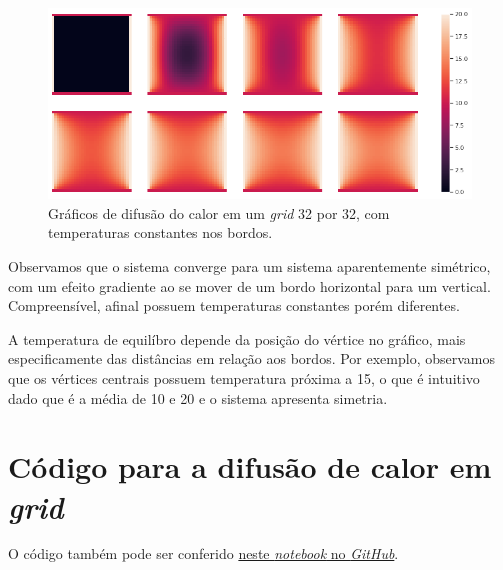 \documentclass{article}
\begin{document}
\begin{itemize}
                \begin{figure}[!h]
                    \includegraphics[width=\textwidth]{graph_2.png}
                    \caption{Gráficos de difusão do calor em um \textit{grid} 32 por 32, com temperaturas constantes nos bordos.}
                    \label{fig:graph_2}
                \end{figure}

                Observamos que o sistema converge para um sistema aparentemente simétrico, com um efeito gradiente ao se mover
                de um bordo horizontal para um vertical. Compreensível, afinal possuem temperaturas constantes porém diferentes.

                A temperatura de equilíbro depende da posição do vértice no gráfico, mais especificamente das distâncias em relação aos bordos.
                Por exemplo, observamos que os vértices centrais possuem temperatura próxima a 15, o que é intuitivo dado que é a média de 10 e 20
                e o sistema apresenta simetria.

        \end{itemize}

    \appendix

    \section{Código para a difusão de calor em \textit{grid}}
        \label{appendix:a}

        O código também pode ser conferido \href{https://github.com/lucasresck/pde/blob/master/list_2/list_2.ipynb}{neste \textit{notebook} no \textit{GitHub}}.
\end{document}
